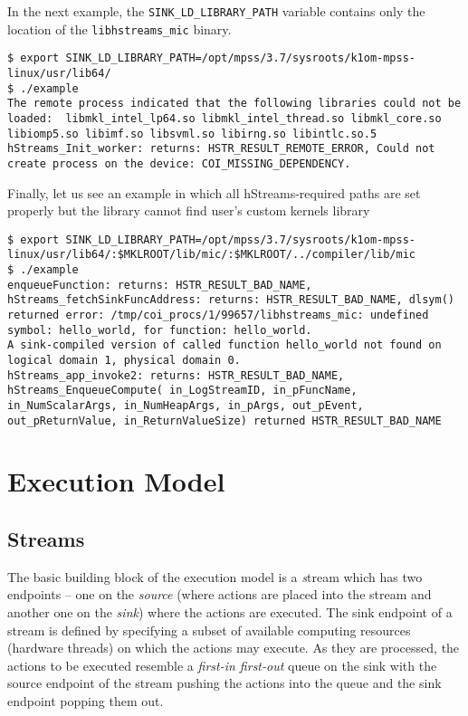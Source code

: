 \documentclass[a4,oneside]{book}
\newcommand{\hstreams}{hStreams}
\begin{document}
In the next example, the \texttt{SINK\_LD\_LIBRARY\_PATH} variable contains only the location of the \texttt{libhstreams\_mic} binary.
\begin{lstlisting}[style=BashCmdListingStyle,caption={Running the example with incomplete \texttt{SINK\_LD\_LIBRARY\_PATH}},frame=tlrb,label={lst:example-incompletesinkld0}]
$ export SINK_LD_LIBRARY_PATH=/opt/mpss/3.7/sysroots/k1om-mpss-linux/usr/lib64/
$ ./example
The remote process indicated that the following libraries could not be loaded:  libmkl_intel_lp64.so libmkl_intel_thread.so libmkl_core.so libiomp5.so libimf.so libsvml.so libirng.so libintlc.so.5
hStreams_Init_worker: returns: HSTR_RESULT_REMOTE_ERROR, Could not create process on the device: COI_MISSING_DEPENDENCY.
\end{lstlisting}

Finally, let us see an example in which all \hstreams-required paths are set properly but the library cannot find user's custom kernels library
\begin{lstlisting}[style=BashCmdListingStyle,caption={Running the example with user's custom kernels library location missing from \texttt{SINK\_LD\_LIBRARY\_PATH}},frame=tlrb,label={lst:example-incompletesinkld1}]
$ export SINK_LD_LIBRARY_PATH=/opt/mpss/3.7/sysroots/k1om-mpss-linux/usr/lib64/:$MKLROOT/lib/mic/:$MKLROOT/../compiler/lib/mic
$ ./example
enqueueFunction: returns: HSTR_RESULT_BAD_NAME, hStreams_fetchSinkFuncAddress: returns: HSTR_RESULT_BAD_NAME, dlsym() returned error: /tmp/coi_procs/1/99657/libhstreams_mic: undefined symbol: hello_world, for function: hello_world.
A sink-compiled version of called function hello_world not found on logical domain 1, physical domain 0.
hStreams_app_invoke2: returns: HSTR_RESULT_BAD_NAME, hStreams_EnqueueCompute( in_LogStreamID, in_pFuncName, in_NumScalarArgs, in_NumHeapArgs, in_pArgs, out_pEvent, out_pReturnValue, in_ReturnValueSize) returned HSTR_RESULT_BAD_NAME
\end{lstlisting}

\section{Execution Model}
\subsection{Streams}
The basic building block of the execution model is a \emph stream which has two endpoints -- one on the \emph{source} (where actions are placed into the stream and another one on the \emph{sink}) where the actions are executed.
The sink endpoint of a stream is defined by specifying a subset of available computing resources (hardware threads) on which the actions may execute.
As they are processed, the actions to be executed resemble a \emph{first-in first-out} queue on the sink with the source endpoint of the stream pushing the actions into the queue and the sink endpoint popping them out.
\end{document}
